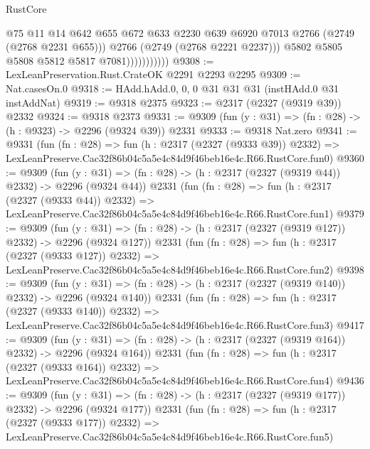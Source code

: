 \begin{lexlean}{RustCore}
\begin{coremodule}
                              @75
                              @11
                              @14
                              @642
                              @655
                              @672
                              @633
                              @2230
                              @639
                              @6920
                              @7013
                              @2766
                              (@2749 (@2768 @2231 @655)))
                            @2766
                            (@2749 (@2768 @2221 @2237)))
                          @5802
                          @5805
                          @5808
                          @5812
                          @5817
                          @7081)))))))))))
@9308 := LexLeanPreservation.Rust.CrateOK @2291 @2293 @2295
@9309 := Nat.casesOn.{0}
@9318 := HAdd.hAdd.{0, 0, 0} @31 @31 @31 (instHAdd.{0} @31 instAddNat)
@9319 := @9318 @2375
@9323 := @2317 (@2327 (@9319 @39)) @2332
@9324 := @9318 @2373
@9331 := @9309 (fun (y : @31) => (fn : @28) -> (h : @9323) -> @2296 (@9324 @39)) @2331
@9333 := @9318 Nat.zero
@9341 := @9331
    (fun (fn : @28) =>
    fun (h : @2317 (@2327 (@9333 @39)) @2332) =>
    LexLeanPreserve.Cac32f86b04c5a5e4c84d9f46beb16e4c.R66.RustCore.fun0)
@9360 := @9309
    (fun (y : @31) => (fn : @28) -> (h : @2317 (@2327 (@9319 @44)) @2332) -> @2296 (@9324 @44))
    @2331
    (fun (fn : @28) =>
    fun (h : @2317 (@2327 (@9333 @44)) @2332) =>
    LexLeanPreserve.Cac32f86b04c5a5e4c84d9f46beb16e4c.R66.RustCore.fun1)
@9379 := @9309
    (fun (y : @31) => (fn : @28) -> (h : @2317 (@2327 (@9319 @127)) @2332) -> @2296 (@9324 @127))
    @2331
    (fun (fn : @28) =>
    fun (h : @2317 (@2327 (@9333 @127)) @2332) =>
    LexLeanPreserve.Cac32f86b04c5a5e4c84d9f46beb16e4c.R66.RustCore.fun2)
@9398 := @9309
    (fun (y : @31) => (fn : @28) -> (h : @2317 (@2327 (@9319 @140)) @2332) -> @2296 (@9324 @140))
    @2331
    (fun (fn : @28) =>
    fun (h : @2317 (@2327 (@9333 @140)) @2332) =>
    LexLeanPreserve.Cac32f86b04c5a5e4c84d9f46beb16e4c.R66.RustCore.fun3)
@9417 := @9309
    (fun (y : @31) => (fn : @28) -> (h : @2317 (@2327 (@9319 @164)) @2332) -> @2296 (@9324 @164))
    @2331
    (fun (fn : @28) =>
    fun (h : @2317 (@2327 (@9333 @164)) @2332) =>
    LexLeanPreserve.Cac32f86b04c5a5e4c84d9f46beb16e4c.R66.RustCore.fun4)
@9436 := @9309
    (fun (y : @31) => (fn : @28) -> (h : @2317 (@2327 (@9319 @177)) @2332) -> @2296 (@9324 @177))
    @2331
    (fun (fn : @28) =>
    fun (h : @2317 (@2327 (@9333 @177)) @2332) =>
    LexLeanPreserve.Cac32f86b04c5a5e4c84d9f46beb16e4c.R66.RustCore.fun5)

\end{coremodule}
\end{lexlean}
